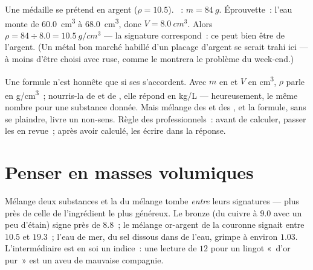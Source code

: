 \begin{example}\label{ex:g7:volume-mass-density:solid}
Une médaille se prétend en argent ($\rho = 10.5$). ~:
$m = \qty{84}{g}$. Éprouvette~: l'eau monte de \qty{60.0}{cm^3} à
\qty{68.0}{cm^3}, donc $V = \qty{8.0}{cm^3}$. Alors
$\rho = 84 \div 8.0 = \qty{10.5}{g/cm^3}$ --- la signature
correspond~: ce peut bien être de l'argent. (Un métal bon marché
habillé d'un placage d'argent se serait trahi ici --- à moins d'être
choisi avec ruse, comme le montrera le problème du week-end.)
\end{example}

\begin{remark}\label{rem:g7:volume-mass-density:units}
Une formule n'est honnête que si ses  s'accordent. Avec $m$ en
 et $V$ en \unit{cm^3}, $\rho$ parle en \unit{g/cm^3}~;
nourris-la de  et de , elle répond en \unit{kg/L}
--- heureusement, le même nombre pour une substance donnée. Mais
mélange des  et des , et la formule, sans se plaindre,
livre un non-sens. Règle des professionnels~: avant de calculer,
passer les  en revue~; après avoir calculé, les écrire dans la
réponse.
\end{remark}

\section{Penser en masses volumiques}

\begin{example}\label{ex:g7:volume-mass-density:alloys}
Mélange deux substances et la  du mélange tombe
\emph{entre} leurs signatures --- plus près de celle de l'ingrédient
le plus généreux. Le bronze (du cuivre à $9.0$ avec un peu d'étain)
signe près de $8.8$~; le mélange or-argent de la couronne signait
entre $10.5$ et $19.3$~; l'eau de mer, du sel dissous dans de l'eau,
grimpe à environ $1.03$. L'intermédiaire est en soi un indice~: une
lecture de $12$ pour un lingot «~d'or pur~» est un aveu de mauvaise
compagnie.
\end{example}

